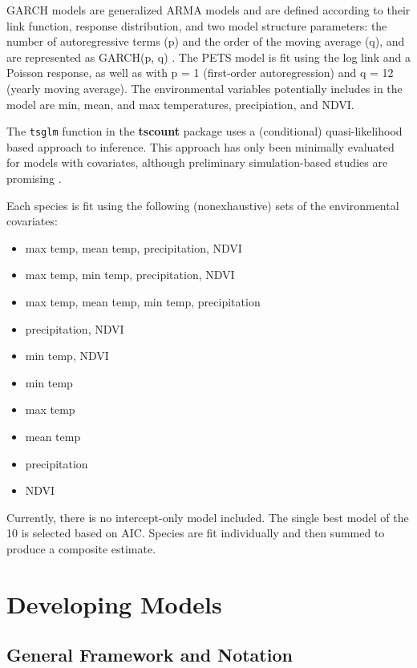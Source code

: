 \documentclass{article}
\def\code#1{\texttt{#1}}
\begin{document}
GARCH models are generalized ARMA models and are defined according to their link function, response distribution, and two model structure parameters: the number of autoregressive terms (p) and the order of the moving average (q), and are represented as GARCH(p, q) \citep{Liboschik2017a}. The PETS model is fit using the log link and a Poisson response, as well as with p = 1 (first-order autoregression) and q = 12 (yearly moving average). The environmental variables potentially includes in the model are min, mean, and max temperatures, precipiation, and NDVI. 

The \code{tsglm} function in the \textbf{tscount} package \citep{Liboschik2017a} uses a (conditional) quasi-likelihood based approach to inference. This approach has only been minimally evaluated for models with covariates, although preliminary simulation-based studies are promising \citep{Liboschik2017b}.  

Each species is fit using the following (nonexhaustive) sets of the environmental covariates:
\begin{itemize}
\item max temp, mean temp, precipitation, NDVI
\item max temp, min temp, precipitation, NDVI
\item max temp, mean temp, min temp, precipitation
\item precipitation, NDVI
\item min temp, NDVI
\item min temp
\item max temp
\item mean temp
\item precipitation 
\item NDVI
\end{itemize}

Currently, there is no intercept-only model included. The single best model of the 10 is selected based on AIC. Species are fit individually and then summed to produce a composite estimate. 

\section{Developing Models}
\label{sec:devmods}

\subsection{General Framework and Notation}
\label{subsec:devmods_gf}
\end{document}
